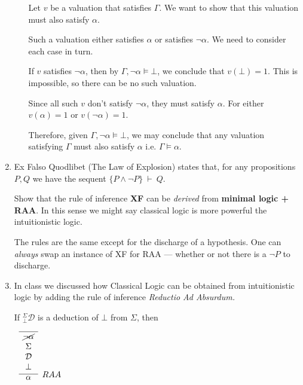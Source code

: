 \documentclass[11pt]{report}
\begin{document}
\begin{enumerate}
\begin{enumerate}
			\hspace{0.2cm}{\bf Solution}

			Let $v$ be a valuation that satisfies $\Gamma$. We want to show that this valuation  must also satisfy $\alpha$.
			
			Such a valuation either satisfies $\alpha$ or satisfies $\lnot \alpha$. We need to consider each case in turn. 

			If $v$ satisfies $\lnot \alpha$, then by $\Gamma, \lnot \alpha \models \bot$, we conclude that $v(\bot) = 1$. This is impossible, so there can be no such valuation. 

			Since all such $v$ don't satisfy $\lnot \alpha$, they must satisfy $\alpha$. For either $v(\alpha) = 1$ or $v(\lnot \alpha) = 1$. 

			Therefore, given $\Gamma, \lnot \alpha \models \bot$, we may conclude that any valuation satisfying $\Gamma$ must also satisfy $\alpha$ i.e.  $\Gamma \models \alpha$.
	
		\end{enumerate}

	\newpage
	\item Ex Falso Quodlibet (The Law of Explosion) states that, for any propositions $P,Q$ we have the sequent $\{P \land \lnot P\} \ \vdash \ Q$. 
	
	Show that the rule of inference {\bf XF} can be \emph{derived} from {\bf minimal logic + RAA}. In this sense we might say classical logic is more powerful the intuitionistic logic.

	\hspace{0.2cm}{\bf Solution}

	The rules are the same except for the discharge of a hypothesis. One can \emph{always} swap an instance of XF for RAA --- whether or not there is a $\lnot P$ to discharge. 

	\newpage
	\item In class we discussed how Classical Logic can be obtained from intuitionistic logic by adding the rule of inference \emph{Reductio Ad Absurdum.} 
	
	If $^{\Sigma}_{\bot}\mathcal{D}$ is a deduction of $\bot$ from $\Sigma$, then
	
	\begin{center}		
		$\begin{array}{c}		
		\infer[RAA]{\alpha}
		{\begin{array}{c} \hline \cancel{\lnot\alpha} \\ \Sigma \\ \mathcal{D} \\ \bot \end{array}}
		\end{array}$
	\end{center}
	

\end{enumerate}
\end{document}
